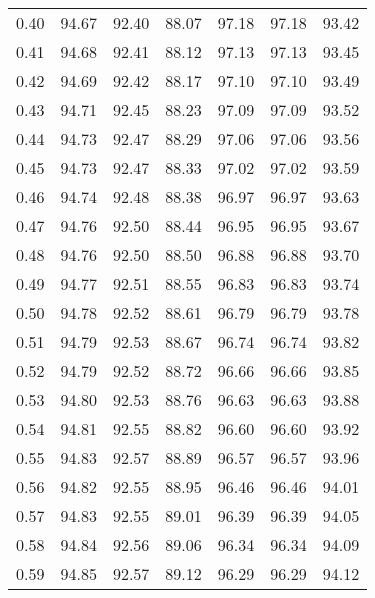 \begin{tabular}{|c|c|c|c|c|c|c|}
      0.40 &     94.67 &     92.40 &      88.07 &   97.18 &      97.18 &         93.42 \\
      0.41 &     94.68 &     92.41 &      88.12 &   97.13 &      97.13 &         93.45 \\
      0.42 &     94.69 &     92.42 &      88.17 &   97.10 &      97.10 &         93.49 \\
      0.43 &     94.71 &     92.45 &      88.23 &   97.09 &      97.09 &         93.52 \\
      0.44 &     94.73 &     92.47 &      88.29 &   97.06 &      97.06 &         93.56 \\
      0.45 &     94.73 &     92.47 &      88.33 &   97.02 &      97.02 &         93.59 \\
      0.46 &     94.74 &     92.48 &      88.38 &   96.97 &      96.97 &         93.63 \\
      0.47 &     94.76 &     92.50 &      88.44 &   96.95 &      96.95 &         93.67 \\
      0.48 &     94.76 &     92.50 &      88.50 &   96.88 &      96.88 &         93.70 \\
      0.49 &     94.77 &     92.51 &      88.55 &   96.83 &      96.83 &         93.74 \\
      0.50 &     94.78 &     92.52 &      88.61 &   96.79 &      96.79 &         93.78 \\
      0.51 &     94.79 &     92.53 &      88.67 &   96.74 &      96.74 &         93.82 \\
      0.52 &     94.79 &     92.52 &      88.72 &   96.66 &      96.66 &         93.85 \\
      0.53 &     94.80 &     92.53 &      88.76 &   96.63 &      96.63 &         93.88 \\
      0.54 &     94.81 &     92.55 &      88.82 &   96.60 &      96.60 &         93.92 \\
      0.55 &     94.83 &     92.57 &      88.89 &   96.57 &      96.57 &         93.96 \\
      0.56 &     94.82 &     92.55 &      88.95 &   96.46 &      96.46 &         94.01 \\
      0.57 &     94.83 &     92.55 &      89.01 &   96.39 &      96.39 &         94.05 \\
      0.58 &     94.84 &     92.56 &      89.06 &   96.34 &      96.34 &         94.09 \\
      0.59 &     94.85 &     92.57 &      89.12 &   96.29 &      96.29 &         94.12 \\

\end{tabular}
